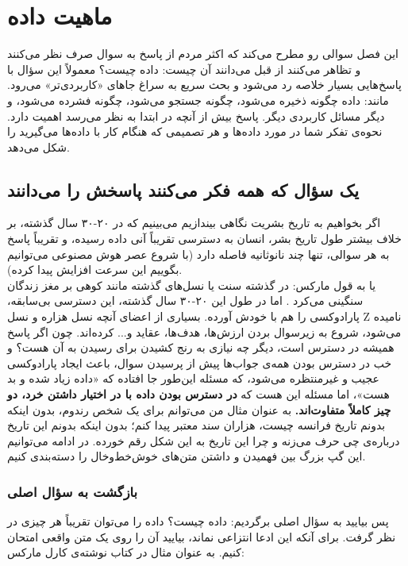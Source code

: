 \chapter{ماهیت داده}
\label{ch:nature-of-data}

این فصل سوالی رو مطرح می‌کند که اکثر مردم از پاسخ به سوال صرف نظر می‌کنند و تظاهر می‌کنند از قبل می‌دانند آن چیست: داده چیست؟
معمولاً این سؤال با پاسخ‌هایی بسیار خلاصه رد می‌شود و بحث سریع به سراغ جاهای «کاربردی‌تر» می‌رود. مانند:
داده چگونه ذخیره می‌شود، چگونه جستجو می‌شود، چگونه فشرده می‌شود، و دیگر مسائل کاربردی دیگر\autocite{knuth1997,shannon1948,pierce1980}. پاسخ بیش از آنچه در ابتدا به نظر می‌رسد اهمیت دارد. نحوه‌ی تفکر شما در مورد داده‌ها و هر تصمیمی که هنگام کار با داده‌ها می‌گیرید را شکل می‌دهد.
\newpage
\section{یک سؤال که همه فکر می‌کنند پاسخش را می‌دانند}
\label{sec:question-everyone-thinks-they-know}

اگر بخواهیم به تاریخ بشریت نگاهی بیندازیم می‌بینیم که در ۲۰-۳۰ سال گذشته، بر خلاف بیشتر طول تاریخ بشر، انسان به دسترسی تقریباً آنی داده رسیده، و تقریباً پاسخ به هر سوالی، تنها چند نانوثانیه فاصله دارد (با شروع عصر هوش مصنوعی می‌توانیم بگوییم این سرعت افزایش پیدا کرده).\\
یا به قول مارکس:
در گذشته سنت یا نسل‌های گذشته مانند کوهی بر مغز زندگان سنگینی می‌کرد \autocite{marx1852}. اما در طول این ۲۰-۳۰ سال گذشته، این دسترسی بی‌سابقه، پارادوکسی را هم با خودش آورده. بسیاری از اعضای آنچه نسل هزاره و نسل Z نامیده می‌شود، شروع به زیرسوال بردن ارزش‌ها، هدف‌ها، عقاید و... کرده‌اند. چون اگر پاسخ همیشه در دسترس است، دیگر چه نیازی به رنج کشیدن برای رسیدن به آن هست؟
و خب در دسترس بودن همه‌ی جواب‌ها پیش از پرسیدن سوال، باعث ایجاد پارادوکسی عجیب و غیرمنتظره می‌شود، که مسئله این‌طور جا افتاده که «داده زیاد شده و بد هست»، اما مسئله این هست که \textbf{در دسترس بودن داده با در اختیار داشتن خرد، دو چیز کاملاً متفاوت‌اند.} به عنوان مثال من می‌توانم برای یک شخص رندوم، بدون اینکه بدونم تاریخ فرانسه چیست، هزاران سند معتبر پیدا کنم؛ بدون اینکه بدونم این تاریخ درباره‌ی چی حرف می‌زنه و چرا این تاریخ به این شکل رقم خورده. در ادامه می‌توانیم این گپ بزرگ بین فهمیدن و داشتن متن‌های خوش‌خط‌وخال را دسته‌بندی کنیم.
\newpage
\subsection{بازگشت به سؤال اصلی}
\label{sub:return-to-main-question}

پس بیایید به سؤال اصلی برگردیم: داده چیست؟ داده را می‌توان تقریباً هر چیزی در نظر گرفت. برای آنکه این ادعا انتزاعی نماند، بیایید آن را روی یک متن واقعی امتحان کنیم. به عنوان مثال در کتاب \textit{} نوشته‌ی کارل مارکس\autocite{marx1852}:

